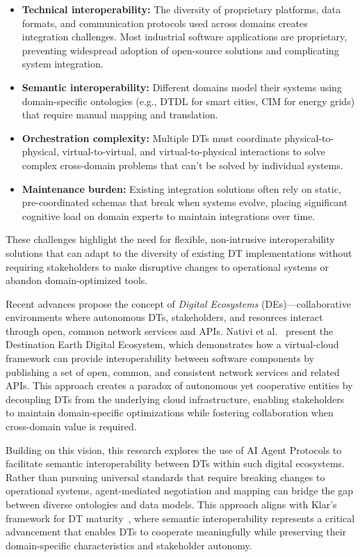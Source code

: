 \begin{itemize}
    \item \textbf{Technical interoperability:} The diversity of proprietary platforms, data formats, and communication protocols used across domains creates integration challenges. Most industrial software applications are proprietary, preventing widespread adoption of open-source solutions and complicating system integration.
    
    \item \textbf{Semantic interoperability:} Different domains model their systems using domain-specific ontologies (e.g., DTDL for smart cities, CIM for energy grids) that require manual mapping and translation.

    \item \textbf{Orchestration complexity:} Multiple DTs must coordinate physical-to-physical, virtual-to-virtual, and virtual-to-physical interactions to solve complex cross-domain problems that can't be solved by individual systems.

    \item \textbf{Maintenance burden:} Existing integration solutions often rely on static, pre-coordinated schemas that break when systems evolve, placing significant cognitive load on domain experts to maintain integrations over time.
\end{itemize}

These challenges highlight the need for flexible, non-intrusive interoperability solutions that can adapt to the diversity of existing DT implementations without requiring stakeholders to make disruptive changes to operational systems or abandon domain-optimized tools.

Recent advances propose the concept of \emph{Digital Ecosystems} (DEs)---collaborative environments where autonomous DTs, stakeholders, and resources interact through open, common network services and APIs.
Nativi et al.~\cite{Nativi_2021} present the Destination Earth Digital Ecosystem, 
    which demonstrates how a virtual-cloud framework can provide interoperability between software components 
    by publishing a set of open, common, and consistent network services and related APIs.
This approach creates a paradox of autonomous yet cooperative entities by decoupling DTs from the underlying cloud infrastructure, 
    enabling stakeholders to maintain domain-specific optimizations while fostering collaboration when cross-domain value is required.

Building on this vision, this research explores the use of AI Agent Protocols
    to facilitate semantic interoperability between DTs within such digital ecosystems.
Rather than pursuing universal standards that require breaking changes to operational systems, agent-mediated negotiation and mapping can bridge the gap between diverse ontologies and data models.
This approach aligns with Klar's framework for DT maturity~\cite{Klar_2024},
    where semantic interoperability represents a critical advancement that enables DTs to cooperate meaningfully while preserving their domain-specific characteristics and stakeholder autonomy.


